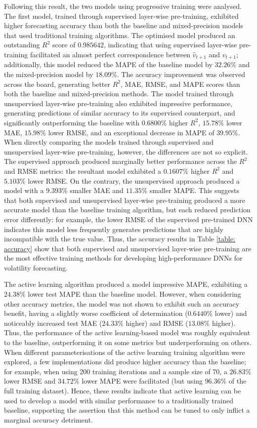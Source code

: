 \documentclass[a4paper, 11pt]{report}
\begin{document}
    Following this result, the two models using progressive training were analysed. The first model, trained through supervised layer-wise pre-training, exhibited higher forecasting accuracy than both the baseline and mixed-precision models that used traditional training algorithms. The optimised model produced an outstanding $R^2$ score of $0.985642$, indicating that using supervised layer-wise pre-training facilitated an almost perfect correspondence between $\hat{v}_{t+1}$ and $v_{t+1}$; additionally, this model reduced the MAPE of the baseline model by $32.26\%$ and the mixed-precision model by $18.09\%$. The accuracy improvement was observed across the board, generating better $R^2$, MAE, RMSE, and MAPE scores than both the baseline and mixed-precision methods. The model trained through unsupervised layer-wise pre-training also exhibited impressive performance, generating predictions of similar accuracy to its supervised counterpart, and significantly outperforming the baseline with $0.6800\%$ higher $R^2$, $15.78\%$ lower MAE, $15.98\%$ lower RMSE, and an exceptional decrease in MAPE of $39.95\%$. When directly comparing the models trained through supervised and unsupervised layer-wise pre-training, however, the differences are not so explicit. The supervised approach produced marginally better performance across the $R^2$ and RMSE metrics: the resultant model exhibited a $0.1607\%$ higher $R^2$ and $5.103\%$ lower RMSE. On the contrary, the unsupervised approach produced a model with a $9.393\%$ smaller MAE and $11.35\%$ smaller MAPE. This suggests that both supervised and unsupervised layer-wise pre-training produced a more accurate model than the baseline training algorithm, but each reduced prediction error differently: for example, the lower RMSE of the supervised pre-trained DNN indicates this model less frequently generates predictions that are highly incompatible with the true value. Thus, the accuracy results in Table \ref{table: accuracy} show that both supervised and unsupervised layer-wise pre-training are the most effective training methods for developing high-performance DNNs for volatility forecasting. 

    The active learning algorithm produced a model impressive MAPE, exhibiting a $24.38\%$ lower test MAPE than the baseline model. However, when considering other accuracy metrics, the model was not shown to exhibit such an accuracy benefit, having a slightly worse coefficient of determination ($0.6440\%$ lower) and noticeably increased test MAE ($24.33\%$ higher) and RMSE ($13.08\%$ higher). Thus, the performance of the active learning-based model was roughly equivalent to the baseline, outperforming it on some metrics but underperforming on others. When different parameterisations of the active learning training algorithm were explored, a few implementations did produce higher accuracy than the baseline; for example, when using 200 training iterations and a sample size of 70, a $26.83\%$ lower RMSE and $34.72\%$ lower MAPE were facilitated (but using $96.36\%$ of the full training dataset). Hence, these results indicate that active learning can be used to develop a model with similar performance to a traditionally trained baseline, supporting the assertion that this method can be tuned to only inflict a marginal accuracy detriment.
\end{document}
